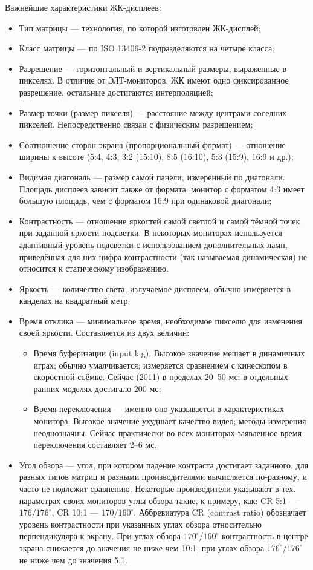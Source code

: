 Важнейшие характеристики ЖК-дисплеев:
\begin{itemize}
\item Тип матрицы --- технология, по которой изготовлен ЖК-дисплей;
 \item Класс матрицы --- по ISO 13406-2 подразделяются на четыре класса;
 \item Разрешение --- горизонтальный и вертикальный размеры, выраженные в пикселях.
  В отличие от ЭЛТ-мониторов, ЖК имеют одно фиксированное разрешение, остальные достигаются интерполяцией;
 \item Размер точки (размер пикселя) --- расстояние между центрами соседних пикселей.
  Непосредственно связан с физическим разрешением;
 \item Соотношение сторон экрана (пропорциональный формат) --- отношение ширины к высоте (5:4, 4:3, 3:2 (15:10), 8:5 (16:10), 5:3 (15:9), 16:9 и др.);
 \item Видимая диагональ --- размер самой панели, измеренный по диагонали.
  Площадь дисплеев зависит также от формата: монитор с форматом 4:3 имеет большую площадь, чем с форматом 16:9 при одинаковой диагонали;
 \item Контрастность --- отношение яркостей самой светлой и самой тёмной точек при заданной яркости подсветки.
  В некоторых мониторах используется адаптивный уровень подсветки с использованием дополнительных ламп, приведённая для них цифра контрастности (так называемая динамическая) не относится к статическому изображению.
 \item Яркость --- количество света, излучаемое дисплеем, обычно измеряется в канделах на квадратный метр.
 \item Время отклика --- минимальное время, необходимое пикселю для изменения своей яркости.
  Составляется из двух величин: 
  \begin{itemize} 
   \item Время буферизации (input lag).
    Высокое значение мешает в динамичных играх; обычно умалчивается; измеряется сравнением с кинескопом в скоростной съёмке.
    Сейчас (2011) в пределах 20--50 мс; в отдельных ранних моделях достигало 200 мс;
   \item Время переключения --- именно оно указывается в характеристиках монитора.
    Высокое значение ухудшает качество видео; методы измерения неоднозначны.
    Сейчас практически во всех мониторах заявленное время переключения составляет 2--6 мс.
  \end{itemize}
 \item Угол обзора --- угол, при котором падение контраста достигает заданного, для разных типов матриц и разными производителями вычисляется по-разному, и часто не подлежит сравнению.
  Некоторые производители указывают в тех. параметрах своих мониторов углы обзора такие, к примеру, как: CR 5:1 --- $176/176^{\circ}$, CR 10:1 --- $170/160^{\circ}$.
  Аббревиатура CR (contrast ratio) обозначает уровень контрастности при указанных углах обзора относительно перпендикуляра к экрану.
  При углах обзора $170^{\circ}/160^{\circ}$ контрастность в центре экрана снижается до значения не ниже чем 10:1, при углах обзора $176^{\circ}/176^{\circ}$ не ниже чем до значения 5:1.
\end{itemize}

